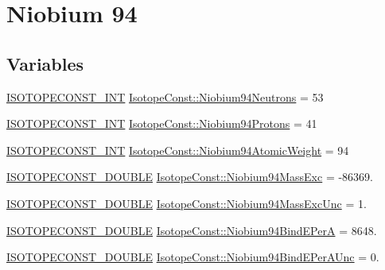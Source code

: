 \hypertarget{group___isotope_const-_niobium-_nb94}{}\section{Niobium 94}
\label{group___isotope_const-_niobium-_nb94}
\subsection*{Variables}
\begin{DoxyCompactItemize}
\item 
\mbox{\hyperlink{group___isotope_const-_macros_ga5f18360b3e99483a35c32d789e62621c}{I\+S\+O\+T\+O\+P\+E\+C\+O\+N\+S\+T\+\_\+\+I\+NT}} \mbox{\hyperlink{group___isotope_const-_niobium-_nb94_gaeea141b36411818f81e0343ac145e63c}{Isotope\+Const\+::\+Niobium94\+Neutrons}} = 53
\item 
\mbox{\hyperlink{group___isotope_const-_macros_ga5f18360b3e99483a35c32d789e62621c}{I\+S\+O\+T\+O\+P\+E\+C\+O\+N\+S\+T\+\_\+\+I\+NT}} \mbox{\hyperlink{group___isotope_const-_niobium-_nb94_ga5ba96555ea2964081b61f6977e267edc}{Isotope\+Const\+::\+Niobium94\+Protons}} = 41
\item 
\mbox{\hyperlink{group___isotope_const-_macros_ga5f18360b3e99483a35c32d789e62621c}{I\+S\+O\+T\+O\+P\+E\+C\+O\+N\+S\+T\+\_\+\+I\+NT}} \mbox{\hyperlink{group___isotope_const-_niobium-_nb94_gaede27eeae4a160ff07a826bf053885a1}{Isotope\+Const\+::\+Niobium94\+Atomic\+Weight}} = 94
\item 
\mbox{\hyperlink{group___isotope_const-_macros_ga8f45a7272ce02c0b4c65c44636ed719a}{I\+S\+O\+T\+O\+P\+E\+C\+O\+N\+S\+T\+\_\+\+D\+O\+U\+B\+LE}} \mbox{\hyperlink{group___isotope_const-_niobium-_nb94_ga49a7ffc1ba4e16903a2a2d670d2322d7}{Isotope\+Const\+::\+Niobium94\+Mass\+Exc}} = -\/86369.
\item 
\mbox{\hyperlink{group___isotope_const-_macros_ga8f45a7272ce02c0b4c65c44636ed719a}{I\+S\+O\+T\+O\+P\+E\+C\+O\+N\+S\+T\+\_\+\+D\+O\+U\+B\+LE}} \mbox{\hyperlink{group___isotope_const-_niobium-_nb94_ga7203d0e3a584da5f5c83fe7840be36d3}{Isotope\+Const\+::\+Niobium94\+Mass\+Exc\+Unc}} = 1.
\item 
\mbox{\hyperlink{group___isotope_const-_macros_ga8f45a7272ce02c0b4c65c44636ed719a}{I\+S\+O\+T\+O\+P\+E\+C\+O\+N\+S\+T\+\_\+\+D\+O\+U\+B\+LE}} \mbox{\hyperlink{group___isotope_const-_niobium-_nb94_ga63964fd0e0d576fe387e572403d24007}{Isotope\+Const\+::\+Niobium94\+Bind\+E\+PerA}} = 8648.
\item 
\mbox{\hyperlink{group___isotope_const-_macros_ga8f45a7272ce02c0b4c65c44636ed719a}{I\+S\+O\+T\+O\+P\+E\+C\+O\+N\+S\+T\+\_\+\+D\+O\+U\+B\+LE}} \mbox{\hyperlink{group___isotope_const-_niobium-_nb94_gafb55c37900031e720141d44d6053ea26}{Isotope\+Const\+::\+Niobium94\+Bind\+E\+Per\+A\+Unc}} = 0.

\end{DoxyCompactItemize}
